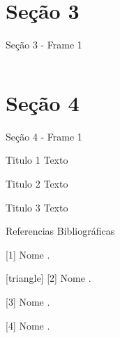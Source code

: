 \documentclass[]{beamer}
\begin{document}
\section{Seção 3}
	\begin{frame}{Seção 3 - Frame 1}
		\begin{columns}
			\lipsum[1-1]
			
			\lipsum[1-1]
		\end{columns}
	\end{frame}
	
\section{Seção 4}
	\begin{frame}{Seção 4 - Frame 1}
		\begin{block}{Titulo 1}
			Texto
		\end{block}
		
		\begin{alertblock}{Titulo 2}
			Texto
		\end{alertblock}
		
		\begin{exampleblock}{Titulo 3}
			Texto
		\end{exampleblock}
	\end{frame}

\begin{frame}{Referencias Bibliográficas}
	\begin{thebibliography}{4} %
		\beamertemplatebookbibitems %
		 [1] Nome
		.
		
		[triangle] %
		 [2] Nome
		.
		
		\beamertemplateonlinebibitems %
		 [3] Nome
		.
		
		\beamertemplatearticlebibitems %
		 [4] Nome
		.
	\end{thebibliography}
\end{frame}
\end{document}
